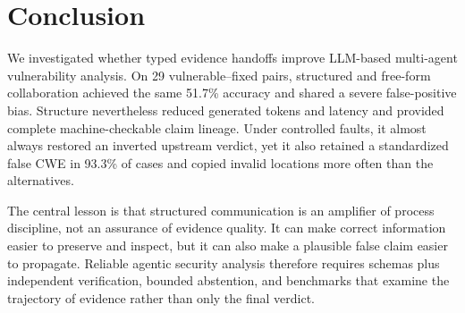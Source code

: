 \section{Conclusion}

We investigated whether typed evidence handoffs improve LLM-based multi-agent vulnerability analysis. On 29 vulnerable--fixed pairs, structured and free-form collaboration achieved the same 51.7\% accuracy and shared a severe false-positive bias. Structure nevertheless reduced generated tokens and latency and provided complete machine-checkable claim lineage. Under controlled faults, it almost always restored an inverted upstream verdict, yet it also retained a standardized false CWE in 93.3\% of cases and copied invalid locations more often than the alternatives.

The central lesson is that structured communication is an amplifier of process discipline, not an assurance of evidence quality. It can make correct information easier to preserve and inspect, but it can also make a plausible false claim easier to propagate. Reliable agentic security analysis therefore requires schemas plus independent verification, bounded abstention, and benchmarks that examine the trajectory of evidence rather than only the final verdict.
